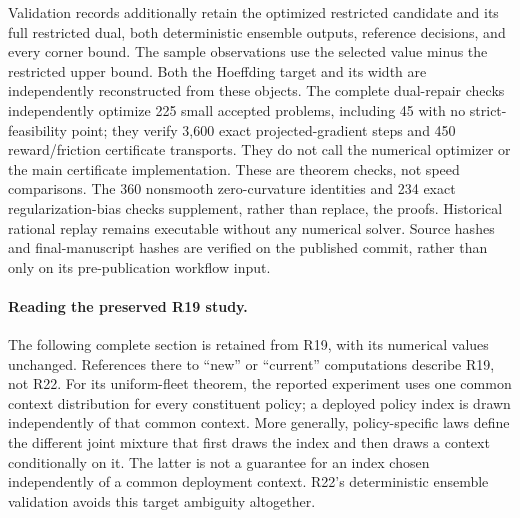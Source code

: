 Validation records additionally retain the optimized restricted candidate and its full restricted dual, both deterministic ensemble outputs, reference decisions, and every corner bound. The sample observations use the selected value minus the restricted upper bound. Both the Hoeffding target and its width are independently reconstructed from these objects. The complete dual-repair checks independently optimize 225 small accepted problems, including 45 with no strict-feasibility point; they verify 3,600 exact projected-gradient steps and 450 reward/friction certificate transports. They do not call the numerical optimizer or the main certificate implementation. These are theorem checks, not speed comparisons. The 360 nonsmooth zero-curvature identities and 234 exact regularization-bias checks supplement, rather than replace, the proofs. Historical rational replay remains executable without any numerical solver. Source hashes and final-manuscript hashes are verified on the published commit, rather than only on its pre-publication workflow input.




\paragraph{Reading the preserved R19 study.}
The following complete section is retained from R19, with its numerical values unchanged. References there to ``new'' or ``current'' computations describe R19, not R22. For its uniform-fleet theorem, the reported experiment uses one common context distribution for every constituent policy; a deployed policy index is drawn independently of that common context. More generally, policy-specific laws define the different joint mixture that first draws the index and then draws a context conditionally on it. The latter is not a guarantee for an index chosen independently of a common deployment context. R22's deterministic ensemble validation avoids this target ambiguity altogether.
